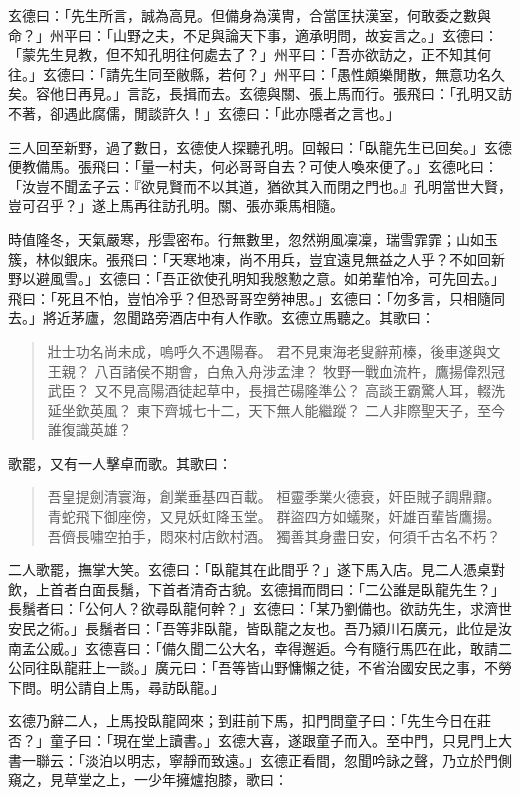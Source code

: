 玄德曰：「先生所言，誠為高見。但備身為漢冑，合當匡扶漢室，何敢委之數與命？」州平曰：「山野之夫，不足與論天下事，適承明問，故妄言之。」玄德曰：「蒙先生見教，但不知孔明往何處去了？」州平曰：「吾亦欲訪之，正不知其何往。」玄德曰：「請先生同至敝縣，若何？」州平曰：「愚性頗樂閒散，無意功名久矣。容他日再見。」言訖，長揖而去。玄德與關、張上馬而行。張飛曰：「孔明又訪不著，卻遇此腐儒，閒談許久！」玄德曰：「此亦隱者之言也。」

三人回至新野，過了數日，玄德使人探聽孔明。回報曰：「臥龍先生已回矣。」玄德便教備馬。張飛曰：「量一村夫，何必哥哥自去？可使人喚來便了。」玄德叱曰：「汝豈不聞孟子云：『欲見賢而不以其道，猶欲其入而閉之門也。』孔明當世大賢，豈可召乎？」遂上馬再往訪孔明。關、張亦乘馬相隨。

時值隆冬，天氣嚴寒，彤雲密布。行無數里，忽然朔風凜凜，瑞雪霏霏；山如玉簇，林似銀床。張飛曰：「天寒地凍，尚不用兵，豈宜遠見無益之人乎？不如回新野以避風雪。」玄德曰：「吾正欲使孔明知我慇懃之意。如弟輩怕冷，可先回去。」飛曰：「死且不怕，豈怕冷乎？但恐哥哥空勞神思。」玄德曰：「勿多言，只相隨同去。」將近茅廬，忽聞路旁酒店中有人作歌。玄德立馬聽之。其歌曰：

\begin{quote}
壯士功名尚未成，嗚呼久不遇陽春。
君不見東海老叟辭荊榛，後車遂與文王親？
八百諸侯不期會，白魚入舟涉孟津？
牧野一戰血流杵，鷹揚偉烈冠武臣？
又不見高陽酒徒起草中，長揖芒碭隆準公？
高談王霸驚人耳，輟洗延坐欽英風？
東下齊城七十二，天下無人能繼蹤？
二人非際聖天子，至今誰復識英雄？
\end{quote}

歌罷，又有一人擊卓而歌。其歌曰：

\begin{quote}
吾皇提劍清寰海，創業垂基四百載。
桓靈季業火德衰，奸臣賊子調鼎鼐。
青蛇飛下御座傍，又見妖虹降玉堂。
群盜四方如蟻聚，奸雄百輩皆鷹揚。
吾儕長嘯空拍手，悶來村店飲村酒。
獨善其身盡日安，何須千古名不朽？
\end{quote}

二人歌罷，撫掌大笑。玄德曰：「臥龍其在此間乎？」遂下馬入店。見二人憑桌對飲，上首者白面長鬚，下首者清奇古貌。玄德揖而問曰：「二公誰是臥龍先生？」長鬚者曰：「公何人？欲尋臥龍何幹？」玄德曰：「某乃劉備也。欲訪先生，求濟世安民之術。」長鬚者曰：「吾等非臥龍，皆臥龍之友也。吾乃潁川石廣元，此位是汝南孟公威。」玄德喜曰：「備久聞二公大名，幸得邂逅。今有隨行馬匹在此，敢請二公同往臥龍莊上一談。」廣元曰：「吾等皆山野慵懶之徒，不省治國安民之事，不勞下問。明公請自上馬，尋訪臥龍。」

玄德乃辭二人，上馬投臥龍岡來；到莊前下馬，扣門問童子曰：「先生今日在莊否？」童子曰：「現在堂上讀書。」玄德大喜，遂跟童子而入。至中門，只見門上大書一聯云：「淡泊以明志，寧靜而致遠。」玄德正看間，忽聞吟詠之聲，乃立於門側窺之，見草堂之上，一少年擁爐抱膝，歌曰：


